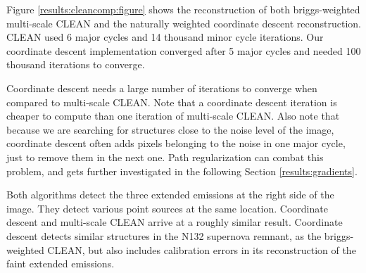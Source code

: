 Figure \ref{results:cleancomp:figure} shows the reconstruction of both briggs-weighted multi-scale CLEAN and the naturally weighted coordinate descent reconstruction.
CLEAN used 6 major cycles and 14 thousand minor cycle iterations. Our coordinate descent implementation converged after 5 major cycles and needed 100 thousand iterations to converge.

Coordinate descent needs a large number of iterations to converge when compared to multi-scale CLEAN. Note that a coordinate descent iteration is cheaper to compute than one iteration of multi-scale CLEAN. Also note that because we are searching for structures close to the noise level of the image, coordinate descent often adds pixels belonging to the noise in one major cycle, just to remove them in the next one. Path regularization\cite{friedman2010regularization} can combat this problem, and gets further investigated in the following Section \ref{results:gradients}.

Both algorithms detect the three extended emissions at the right side of the image. They detect various point sources at the same location. Coordinate descent and multi-scale CLEAN arrive at a roughly similar result. Coordinate descent detects similar structures in the N132 supernova remnant, as the briggs-weighted CLEAN, but also includes calibration errors in its reconstruction of the faint extended emissions.


